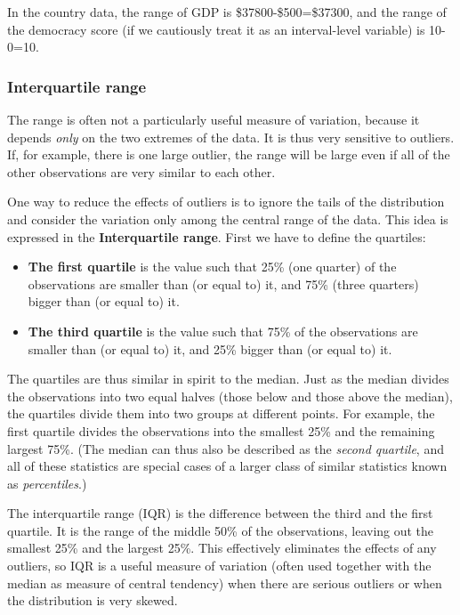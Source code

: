 In the country data, the range of GDP is \$37800-\$500=\$37300, and the
range of the democracy score (if we cautiously treat it as an
interval-level variable) is 10-0=10.

\subsubsection{Interquartile range}

The range is often not a particularly useful measure of variation,
because it depends \emph{only} on the two extremes of the data. It is
thus very sensitive to outliers. If, for example, there is one large
outlier, the range will be large even if all of the other observations
are very similar to each other.

One way to reduce the effects of outliers is to ignore the tails of the
distribution and consider the variation only among the central range of
the data. This idea is expressed in the \textbf{Interquartile range}.
First we have to define the quartiles:
\begin{itemize}
\item
\textbf{The first quartile} is the value such that 25\% (one quarter)
of the observations are smaller than (or equal to) it, and 75\% (three
quarters) bigger than (or equal to) it.
\item
\textbf{The third quartile} is the value such that 75\%
of the observations are smaller than (or equal to) it, and 25\%
bigger than (or equal to) it.
\end{itemize}
The quartiles are thus similar in spirit to the median. Just as the
median divides the observations into two equal halves (those below and
those above the median), the quartiles divide them into two groups at
different points. For example, the first quartile divides the
observations into the smallest 25\% and the remaining largest 75\%. (The
median can thus also be described as the \emph{second quartile}, and all
of these statistics are special cases of a larger class of similar
statistics known as \emph{percentiles}.)

The interquartile range (IQR) is the difference between the third and
the first quartile. It is the range of the middle 50\% of the
observations, leaving out the smallest 25\% and the largest 25\%.
This effectively eliminates the effects of any outliers, so IQR is
a useful measure of variation (often used together with the median as
measure of central tendency) when there are serious outliers or when
the distribution is very skewed.

